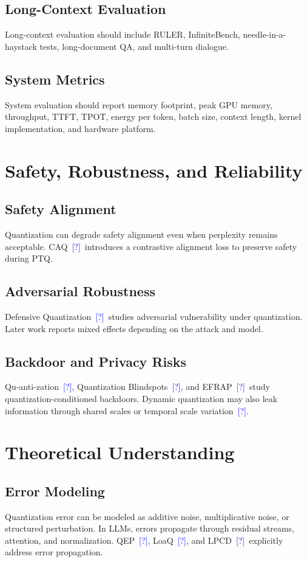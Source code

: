 \documentclass[journal,10pt]{IEEEtran}
\newcommand{\CITE}{\textcolor{blue}{[?]}}
\begin{document}
\subsection{Long-Context Evaluation}
Long-context evaluation should include RULER, InfiniteBench, needle-in-a-haystack tests, long-document QA, and multi-turn dialogue.

\subsection{System Metrics}
System evaluation should report memory footprint, peak GPU memory, throughput, TTFT, TPOT, energy per token, batch size, context length, kernel implementation, and hardware platform.

\section{Safety, Robustness, and Reliability}

\subsection{Safety Alignment}
Quantization can degrade safety alignment even when perplexity remains acceptable. CAQ~\CITE\ introduces a contrastive alignment loss to preserve safety during PTQ.

\subsection{Adversarial Robustness}
Defensive Quantization~\CITE\ studies adversarial vulnerability under quantization. Later work reports mixed effects depending on the attack and model.

\subsection{Backdoor and Privacy Risks}
Qu-anti-zation~\CITE, Quantization Blindspots~\CITE, and EFRAP~\CITE\ study quantization-conditioned backdoors. Dynamic quantization may also leak information through shared scales or temporal scale variation~\CITE.

\section{Theoretical Understanding}

\subsection{Error Modeling}
Quantization error can be modeled as additive noise, multiplicative noise, or structured perturbation. In LLMs, errors propagate through residual streams, attention, and normalization. QEP~\CITE, LoaQ~\CITE, and LPCD~\CITE\ explicitly address error propagation.
\end{document}
